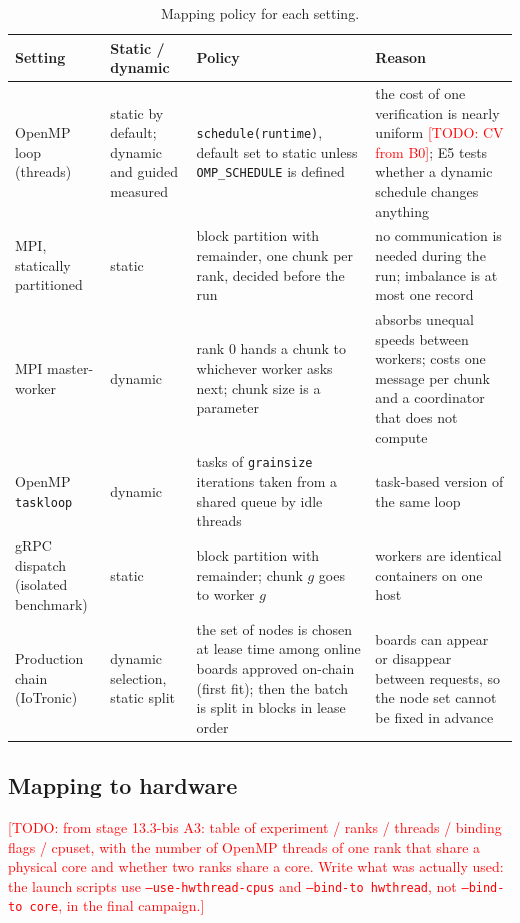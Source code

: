 \documentclass[11pt,a4paper]{article}
\newcommand{\todo}[1]{\textcolor{red}{[TODO: #1]}}
\begin{document}
\begin{table}[H]
\centering\small
\begin{tabular}{p{3.2cm}p{2.4cm}p{4.2cm}p{4.2cm}}
\toprule
\textbf{Setting} & \textbf{Static / dynamic} & \textbf{Policy} & \textbf{Reason} \\
\midrule
OpenMP loop (threads) & static by default; dynamic and guided measured & \texttt{schedule(runtime)}, default set to static unless \texttt{OMP\_SCHEDULE} is defined & the cost of one verification is nearly uniform \todo{CV from B0}; E5 tests whether a dynamic schedule changes anything \\
MPI, statically partitioned & static & block partition with remainder, one chunk per rank, decided before the run & no communication is needed during the run; imbalance is at most one record \\
MPI master-worker & dynamic & rank 0 hands a chunk to whichever worker asks next; chunk size is a parameter & absorbs unequal speeds between workers; costs one message per chunk and a coordinator that does not compute \\
OpenMP \texttt{taskloop} & dynamic & tasks of \texttt{grainsize} iterations taken from a shared queue by idle threads & task-based version of the same loop \\
gRPC dispatch (isolated benchmark) & static & block partition with remainder; chunk $g$ goes to worker $g$ & workers are identical containers on one host \\
Production chain (IoTronic) & dynamic selection, static split & the set of nodes is chosen at lease time among online boards approved on-chain (first fit); then the batch is split in blocks in lease order & boards can appear or disappear between requests, so the node set cannot be fixed in advance \\
\bottomrule
\end{tabular}
\caption{Mapping policy for each setting.}
\end{table}

\subsection{Mapping to hardware}

\todo{from stage 13.3-bis A3: table of experiment / ranks / threads / binding flags / cpuset, with the number of OpenMP threads of one rank that share a physical core and whether two ranks share a core. Write what was actually used: the launch scripts use \texttt{--use-hwthread-cpus} and \texttt{--bind-to hwthread}, not \texttt{--bind-to core}, in the final campaign.}
\end{document}
